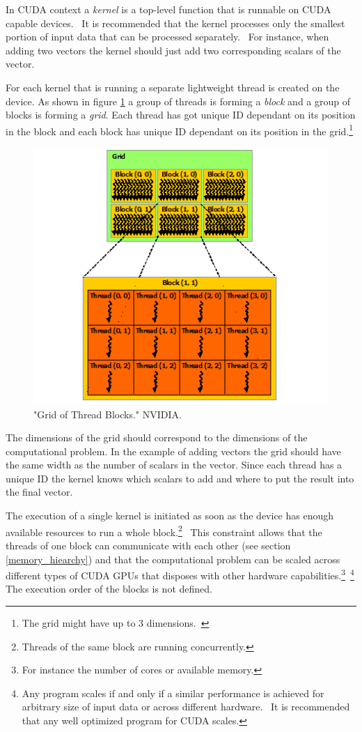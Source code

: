 \documentclass[12pt,oneside]{fithesis2}
\begin{document}
In CUDA context a \emph{kernel} is a top-level function that is runnable on CUDA capable devices.~\cite{cuda_guide} It is recommended that the kernel processes only the smallest portion of input data that can be processed separately.~\cite{data_parallel_algorithms} For instance, when adding two vectors the kernel should just add two corresponding scalars of the vector.

For each kernel that is running a separate lightweight thread is created on the device. As shown in figure \ref{fig:grid} a group of threads is forming a \emph{block} and a group of blocks is forming a \emph{grid}. Each thread has got unique ID dependant on its position in the block and each block has unique ID dependant on its position in the grid.\footnote{The grid might have up to 3 dimensions.~\cite{cuda_guide}}

\begin{figure}[H]
	\centering
	\includegraphics[scale=0.9]{figures/grid-of-thread-blocks.png}
	\caption{"Grid of Thread Blocks." NVIDIA. \cite{cuda_guide}}
	\label{fig:grid}
\end{figure}

The dimensions of the grid should correspond to the dimensions of the computational problem. In the example of adding vectors the grid should have the same width as the number of scalars in the vector. Since each thread has a unique ID the kernel knows which scalars to add and where to put the result into the final vector.

The execution of a single kernel is initiated as soon as the device has enough available resources to run a whole block.\footnote{Threads of the same block are running concurrently.}~\cite{cuda_guide} This constraint allows that the threads of one block can communicate with each other (see section \ref{memory_hiearchy}) and that the computational problem can be scaled across different types of CUDA GPUs that disposes with other hardware capabilities.\footnote{For instance the number of cores or available memory.}~\footnote{Any program scales if and only if a similar performance is achieved for arbitrary size of input data or across different hardware.~\cite{cuda_best_practices} It is recommended that any well optimized program for CUDA scales.} The execution order of the blocks is not defined.
\end{document}
